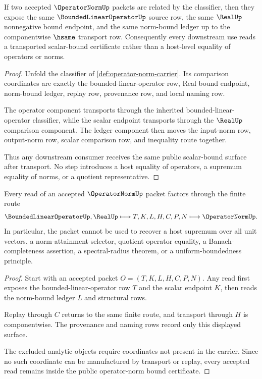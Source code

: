 \begin{theorem}
\label{thm:operator-norm-bound-stability}
If two accepted $\OperatorNormUp$ packets are related by the classifier, then they expose the same $\BoundedLinearOperatorUp$ source row, the same $\RealUp$ nonnegative bound endpoint, and the same norm-bound ledger up to the componentwise $\hsame$ transport row. Consequently every downstream use reads a transported scalar-bound certificate rather than a host-level equality of operators or norms.
\end{theorem}
\begin{proof}
Unfold the classifier of \autoref{def:operator-norm-carrier}. Its comparison coordinates are exactly the bounded-linear-operator row, Real bound endpoint, norm-bound ledger, replay row, provenance row, and local naming row.

The operator component transports through the inherited bounded-linear-operator classifier, while the scalar endpoint transports through the $\RealUp$ comparison component. The ledger component then moves the input-norm row, output-norm row, scalar comparison row, and inequality route together.

Thus any downstream consumer receives the same public scalar-bound surface after transport. No step introduces a host equality of operators, a supremum equality of norms, or a quotient representative.
\end{proof}

\begin{theorem}
\label{thm:operator-norm-nonescape-boundary}
Every read of an accepted $\OperatorNormUp$ packet factors through the finite route
$$
\BoundedLinearOperatorUp,\RealUp
\longmapsto T,K,L,H,C,P,N
\longmapsto \OperatorNormUp .
$$
In particular, the packet cannot be used to recover a host supremum over all unit vectors, a norm-attainment selector, quotient operator equality, a Banach-completeness assertion, a spectral-radius theorem, or a uniform-boundedness principle.
\end{theorem}
\begin{proof}
Start with an accepted packet $O=(T,K,L,H,C,P,N)$. Any read first exposes the bounded-linear-operator row $T$ and the scalar endpoint $K$, then reads the norm-bound ledger $L$ and structural rows.

Replay through $C$ returns to the same finite route, and transport through $H$ is componentwise. The provenance and naming rows record only this displayed surface.

The excluded analytic objects require coordinates not present in the carrier. Since no such coordinate can be manufactured by transport or replay, every accepted read remains inside the public operator-norm bound certificate.
\end{proof}

